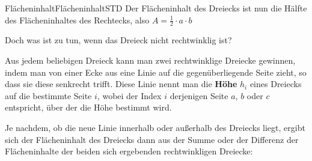\begin{MXContent}{Fl\"acheninhalt}{Fl\"acheninhalt}{STD}
Der Fl\"acheninhalt des Dreiecks ist nun die H\"alfte des Fl\"acheninhaltes des Rechtecks, also $A=\frac{1}{2}\cdot a\cdot b$

Doch was ist zu tun,
wenn das Dreieck nicht rechtwinklig ist?



Aus jedem beliebigen Dreieck kann man zwei rechtwinklige Dreiecke gewinnen, indem man von einer Ecke aus eine Linie auf die gegen\"uberliegende Seite zieht, so dass sie diese senkrecht trifft. Diese Linie nennt man die \textbf{H\"ohe} $h_{i}$ eines Dreiecks auf die bestimmte Seite $i$, wobei der Index $i$ derjenigen Seite $a$, $b$ oder $c$ entspricht, \"uber der die H\"ohe bestimmt wird.

Je nachdem, ob die neue Linie innerhalb oder au\ss erhalb des Dreiecks liegt, ergibt sich der Fl\"acheninhalt des Dreiecks dann aus der Summe oder der Differenz der Fl\"acheninhalte der beiden sich ergebenden rechtwinkligen Dreiecke:
\begin{center}
\hspace{4em}
\end{center}


\end{MXContent}
